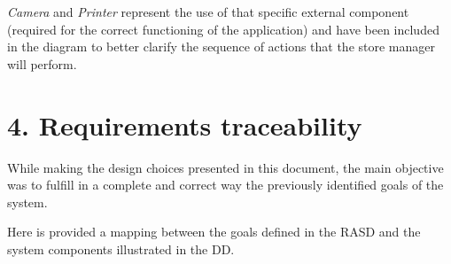 \emph{Camera} and \emph{Printer} represent the use of that specific external component (required for the correct functioning of the application) and have been included in the diagram to better clarify the sequence of actions that the store manager will perform.

\chapter{4. Requirements traceability}

While making the design choices presented in this document, the main objective was to fulfill in a complete and correct way the previously identified goals of the system.

Here is provided a mapping between the goals defined in the RASD and the system components illustrated in the DD.

